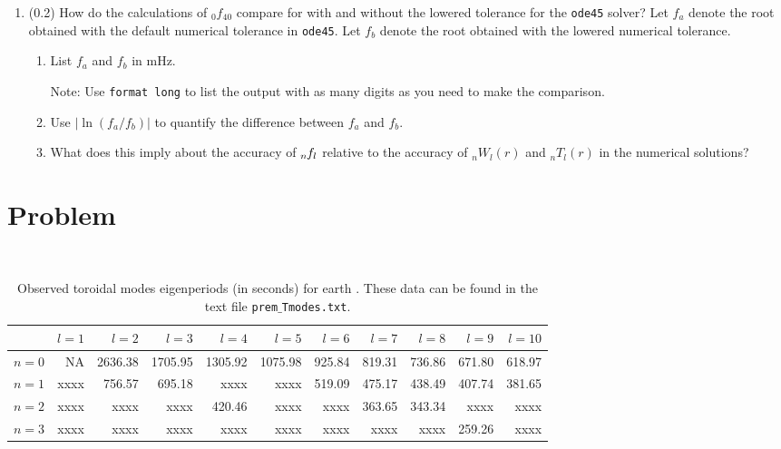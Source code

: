 \documentclass[11pt,titlepage,fleqn]{article}
\newcommand{\Tnl}{\mbox{${}_nT_l$}}   %
\newcommand{\Wnl}{\mbox{${}_nW_l$}}   %
\newcommand{\fnl}{\mbox{${}_{n\hspace{-0.2 mm}}f_l$}}        %
\newcommand{\blank}{xxxx}
\begin{document}
\begin{enumerate}
\item (0.2)  How do the calculations of $_0f_{40}$ compare for with and without the lowered tolerance for the \verb+ode45+ solver? 
Let $f_a$ denote the root obtained with the default numerical tolerance in \verb+ode45+. Let $f_b$ denote the root obtained with the lowered numerical tolerance. 
%
\begin{enumerate}
\item
List $f_a$ and $f_b$ in mHz.

Note: Use \verb+format long+ to list the output with as many digits as you need to make the comparison.

\item Use $|\ln(f_a/f_b)|$ to quantify the difference between $f_a$ and $f_b$.

\item What does this imply about the accuracy of $\fnl$ relative to the accuracy of $\Wnl(r)$ and $\Tnl(r)$ in the numerical solutions?
\end{enumerate}

\end{enumerate}


\section*{Problem} \howmuchtime\



\begin{table}[b]
\centering
\caption[]
{{
Observed toroidal modes eigenperiods (in seconds) for earth \citep{PREM}. These data can be found in the text file {\tt prem$\_$Tmodes.txt}.
\label{tab:modes_obs}
}}
\begin{tabular}{||r|r|r|r|r|r|r|r|r|r|r||}
\hline
      & $l=1$ & $l=2$ & $l=3$ & $l=4$ & $l=5$ & $l=6$ & $l=7$ & $l=8$ & $l=9$ & $l=10$ \\ \hline\hline
$n=0$ & NA & 2636.38 & 1705.95 & 1305.92 & 1075.98 & 925.84 & 819.31 & 736.86 & 671.80 & 618.97 \\ \hline
$n=1$ & \blank & 756.57 & 695.18 & \blank & \blank & 519.09 & 475.17 & 438.49 & 407.74 & 381.65 \\ \hline
$n=2$ & \blank & \blank & \blank & 420.46 & \blank & \blank & 363.65 & 343.34 & \blank & \blank \\ \hline
$n=3$ & \blank & \blank & \blank & \blank & \blank & \blank & \blank & \blank & 259.26 & \blank \\ \hline
\hline
\end{tabular}
\end{table}
\end{document}
